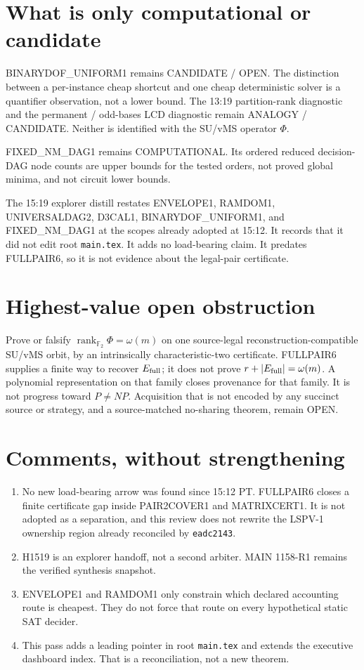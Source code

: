 \documentclass[11pt]{article}
\begin{document}
\section*{What is only computational or candidate}
BINARYDOF\_UNIFORM1 remains CANDIDATE / OPEN. The distinction between a per-instance
cheap shortcut and one cheap deterministic solver is a quantifier observation, not a
lower bound. The 13:19 partition-rank diagnostic and the permanent / odd-bases LCD
diagnostic remain ANALOGY / CANDIDATE. Neither is identified with the SU/vMS operator
\(\Phi\).

FIXED\_NM\_DAG1 remains COMPUTATIONAL. Its ordered reduced decision-DAG node counts are
upper bounds for the tested orders, not proved global minima, and not circuit lower bounds.

The 15:19 explorer distill restates ENVELOPE1, RAMDOM1, UNIVERSALDAG2, D3CAL1,
BINARYDOF\_UNIFORM1, and FIXED\_NM\_DAG1 at the scopes already adopted at 15:12. It
records that it did not edit root \texttt{main.tex}. It adds no load-bearing claim. It
predates FULLPAIR6, so it is not evidence about the legal-pair certificate.

\section*{Highest-value open obstruction}
Prove or falsify \(\operatorname{rank}_{\mathbb F_2}\Phi=\omega(m)\) on one source-legal
reconstruction-compatible SU/vMS orbit, by an intrinsically characteristic-two certificate.
FULLPAIR6 supplies a finite way to recover \(E_{\rm full}\); it does not prove
\(r+|E_{\rm full}|=\omega(m)\). A polynomial representation on that family closes
provenance for that family. It is not progress toward \(P\neq NP\). Acquisition that is
not encoded by any succinct source or strategy, and a source-matched no-sharing theorem,
remain OPEN.

\section*{Comments, without strengthening}
\begin{enumerate}
\item No new load-bearing arrow was found since 15:12 PT. FULLPAIR6 closes a finite
certificate gap inside PAIR2COVER1 and MATRIXCERT1. It is not adopted as a separation,
and this review does not rewrite the LSPV-1 ownership region already reconciled by
\texttt{eadc2143}.
\item H1519 is an explorer handoff, not a second arbiter. MAIN 1158-R1 remains the
verified synthesis snapshot.
\item ENVELOPE1 and RAMDOM1 only constrain which declared accounting route is cheapest.
They do not force that route on every hypothetical static SAT decider.
\item This pass adds a leading pointer in root \texttt{main.tex} and extends the executive
dashboard index. That is a reconciliation, not a new theorem.
\end{enumerate}
\end{document}
